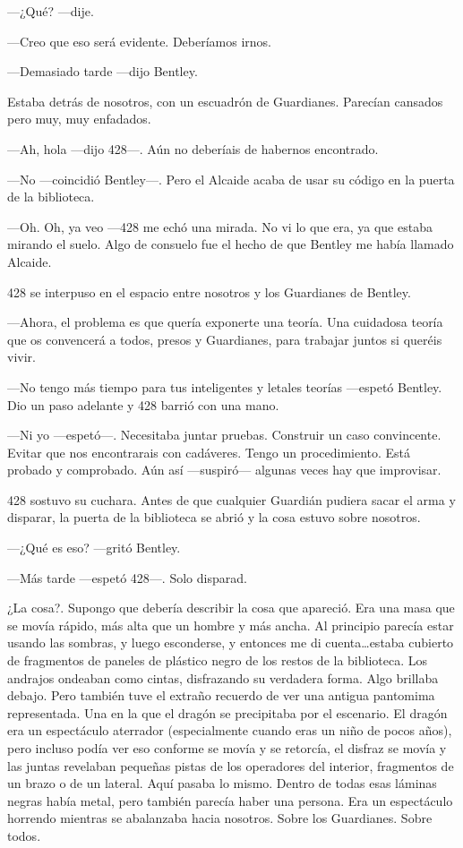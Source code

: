 ---¿Qué? ---dije.

---Creo que eso será evidente. Deberíamos irnos.

---Demasiado tarde ---dijo Bentley.

Estaba detrás de nosotros, con un escuadrón de Guardianes. Parecían
cansados pero muy, muy enfadados.

---Ah, hola ---dijo 428---. Aún no deberíais de habernos encontrado.

---No ---coincidió Bentley---. Pero el Alcaide acaba de usar su código
en la puerta de la biblioteca.

---Oh. Oh, ya veo ---428 me echó una mirada. No vi lo que era, ya que
estaba mirando el suelo. Algo de consuelo fue el hecho de que Bentley me
había llamado Alcaide.

428 se interpuso en el espacio entre nosotros y los Guardianes de
Bentley.

---Ahora, el problema es que quería exponerte una teoría. Una cuidadosa
teoría que os convencerá a todos, presos y Guardianes, para trabajar
juntos si queréis vivir.

---No tengo más tiempo para tus inteligentes y letales teorías ---espetó
Bentley. Dio un paso adelante y 428 barrió con una mano.

---Ni yo ---espetó---. Necesitaba juntar pruebas. Construir un caso
convincente. Evitar que nos encontrarais con cadáveres. Tengo un
procedimiento. Está probado y comprobado. Aún así ---suspiró--- algunas
veces hay que improvisar.

428 sostuvo su cuchara. Antes de que cualquier Guardián pudiera sacar el
arma y disparar, la puerta de la biblioteca se abrió y la cosa estuvo
sobre nosotros.

---¿Qué es eso? ---gritó Bentley.

---Más tarde ---espetó 428---. Solo disparad.

¿La cosa?. Supongo que debería describir la cosa que apareció. Era una
masa que se movía rápido, más alta que un hombre y más ancha. Al
principio parecía estar usando las sombras, y luego esconderse, y
entonces me di cuenta\ldots{}estaba cubierto de fragmentos de paneles de
plástico negro de los restos de la biblioteca. Los andrajos ondeaban
como cintas, disfrazando su verdadera forma. Algo brillaba debajo. Pero
también tuve el extraño recuerdo de ver una antigua pantomima
representada. Una en la que el dragón se precipitaba por el escenario.
El dragón era un espectáculo aterrador (especialmente cuando eras un
niño de pocos años), pero incluso podía ver eso conforme se movía y se
retorcía, el disfraz se movía y las juntas revelaban pequeñas pistas de
los operadores del interior, fragmentos de un brazo o de un lateral.
Aquí pasaba lo mismo. Dentro de todas esas láminas negras había metal,
pero también parecía haber una persona. Era un espectáculo horrendo
mientras se abalanzaba hacia nosotros. Sobre los Guardianes. Sobre
todos.


